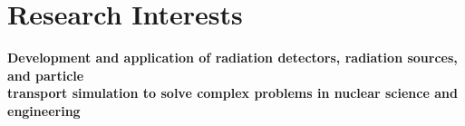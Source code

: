 \documentclass[10pt]{article}
\begin{document}

%
%


\newlength{\rcollength}\setlength{\rcollength}{3.0in}%
\newlength{\spacewidth}\setlength{\spacewidth}{20pt}
\newcommand\spacechar{$|$}

\section{Research Interests}
\textbf{Development and application of radiation detectors, radiation
  sources, and particle \\ transport simulation to solve complex
  problems in nuclear science and engineering}\vspace{0.1cm}
\end{document}
